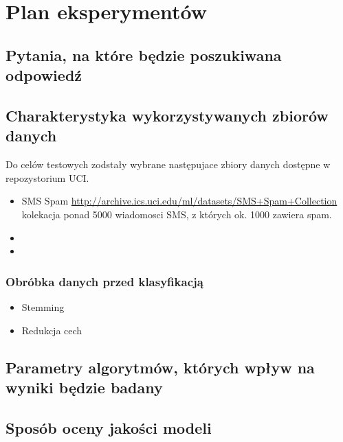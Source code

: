 \documentclass[a4paper, 10pt]{article}
\begin{document}

\section{Plan eksperymentów}
\subsection{Pytania, na które będzie poszukiwana odpowiedź}

\subsection{Charakterystyka wykorzystywanych zbiorów danych}

Do celów testowych zodstały wybrane następujace zbiory danych dostępne w repozystorium UCI.


\begin{itemize}
\item{SMS Spam \url{http://archive.ics.uci.edu/ml/datasets/SMS+Spam+Collection} \\ kolekacja ponad 5000 wiadomosci SMS, z których ok. 1000 zawiera spam.} 
\item{}
\item{} 
\end{itemize}



\subsubsection{Obróbka danych przed klasyfikacją}

\begin{itemize}
\item{Stemming}
\item{Redukcja cech}
\end{itemize}


\subsection{Parametry algorytmów, których wpływ na wyniki będzie badany}


\subsection{Sposób oceny jakości modeli}

\nocite{*}

\end{document}
